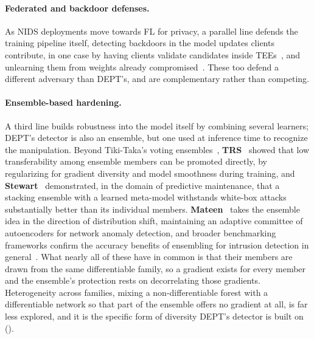 \paragraph{Federated and backdoor defenses.}
As \ac{NIDS} deployments move towards \ac{FL} for privacy, a parallel line defends the
training pipeline itself, detecting backdoors in the model updates clients contribute,
in one case by having clients validate candidates inside \acp{TEE}~\cite{wan2025energy,xu2025detecting,rieger2024crowdguard},
and unlearning them from weights already
compromised~\cite{zhu2023selective,kumari2023baybfed,nguyen2025pbp}.
These too defend a different adversary than DEPT's, and are complementary rather than
competing.

\paragraph{Ensemble-based hardening.}
A third line builds robustness into the model itself by combining several learners;
DEPT's detector is also an ensemble, but one used at inference time to recognize the
manipulation. Beyond Tiki-Taka's voting
ensembles~\cite{zhang2020tiki}, \textbf{TRS}~\cite{yang2021trs} showed that low
transferability among ensemble members can be promoted directly, by regularizing for
gradient diversity and model smoothness during training, and
\textbf{Stewart}~\cite{gungor2022stewart} demonstrated, in the domain of
predictive maintenance, that a stacking ensemble with a learned meta-model withstands
white-box attacks substantially better than its individual members.
\textbf{Mateen}~\cite{alotaibi2024mateen} takes the ensemble idea in the direction of
distribution shift, maintaining an adaptive committee of autoencoders for network
anomaly detection, and broader benchmarking frameworks confirm the accuracy benefits
of ensembling for intrusion detection in general~\cite{bibers2025ensemble}. What
nearly all of these have in common is that their members are drawn from the same
differentiable family, so a gradient exists for every member and the ensemble's
protection rests on decorrelating those gradients. Heterogeneity across families,
mixing a non-differentiable forest with a differentiable network so that part of the
ensemble offers no gradient at all, is far less explored, and it is the specific form
of diversity DEPT's detector is built on ().

